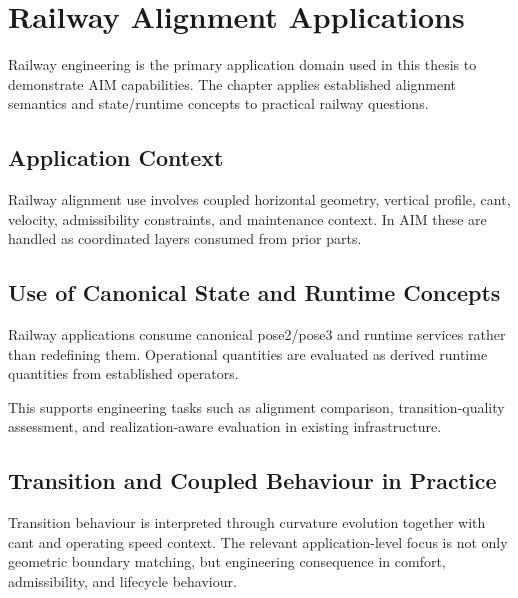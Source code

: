 
\chapter{Railway Alignment Applications}

\label{chap:applications-railway}

Railway engineering is the primary application domain used in this
thesis to demonstrate AIM capabilities. The chapter applies established
alignment semantics and state/runtime concepts to practical railway
questions.

\section{Application Context}

Railway alignment use involves coupled horizontal geometry, vertical
profile, cant, velocity, admissibility constraints, and maintenance
context. In AIM these are handled as coordinated layers consumed from
prior parts.

\section{Use of Canonical State and Runtime Concepts}

Railway applications consume canonical pose2/pose3 and runtime services
rather than redefining them. Operational quantities are evaluated as
derived runtime quantities from established operators.

This supports engineering tasks such as alignment comparison,
transition-quality assessment, and realization-aware evaluation in
existing infrastructure.

\section{Transition and Coupled Behaviour in Practice}

Transition behaviour is interpreted through curvature evolution together
with cant and operating speed context. The relevant application-level
focus is not only geometric boundary matching, but engineering
consequence in comfort, admissibility, and lifecycle behaviour.


